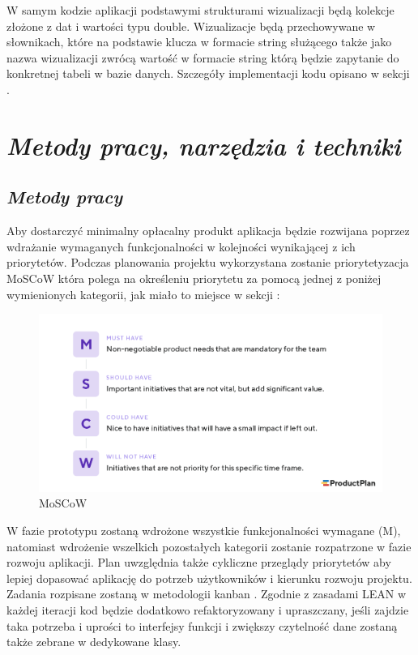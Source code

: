 \documentclass[a4paper,10pt, twoside]{report}
\newcommand{\customstylechapter}[1]{\large{\textit{#1}}}
\newcommand{\customstylesection}[1]{\textbf{\textit{#1}}}
\begin{document}
{W samym kodzie aplikacji podstawymi strukturami wizualizacji będą kolekcje 
złożone z dat i wartości typu double. Wizualizacje będą przechowywane w 
słownikach, które na podstawie klucza w formacie string służącego także jako 
nazwa wizualizacji zwrócą wartość w formacie string którą będzie zapytanie do 
konkretnej tabeli w bazie danych. Szczegóły implementacji kodu opisano w sekcji 
.}


\chapter{\customstylechapter{Metody pracy, narzędzia i techniki}}
\section{\customstylesection{Metody pracy}}
{Aby dostarczyć minimalny opłacalny produkt \cite{MVP} aplikacja będzie 
rozwijana poprzez wdrażanie wymaganych funkcjonalności w kolejności wynikającej 
z ich priorytetów. Podczas planowania projektu wykorzystana zostanie 
priorytetyzacja MoSCoW \cite{MOSCOW} która polega na określeniu priorytetu za 
pomocą jednej z poniżej wymienionych kategorii, jak miało to miejsce w sekcji 
:
\begin{figure}[H]           %
    \caption{MoSCoW}
    \label{fig:MoSCoW}
    \centering  
    \includegraphics[width=12cm]{figures/MoSCoW-01.png}
\end{figure}
W fazie prototypu zostaną wdrożone wszystkie funkcjonalności wymagane (M), 
natomiast wdrożenie wszelkich pozostałych kategorii zostanie rozpatrzone w fazie
 rozwoju aplikacji. Plan uwzględnia także cykliczne przeglądy priorytetów aby 
 lepiej dopasować aplikację do potrzeb użytkowników i kierunku rozwoju projektu.
 Zadania rozpisane zostaną w metodologii kanban \cite{Kanban}. Zgodnie z 
zasadami LEAN \cite{LEAN} w każdej iteracji kod będzie dodatkowo refaktoryzowany
 i upraszczany, jeśli zajdzie taka potrzeba i uprości to interfejsy funkcji i 
zwiększy czytelność dane zostaną także zebrane w dedykowane klasy.}
\end{document}
